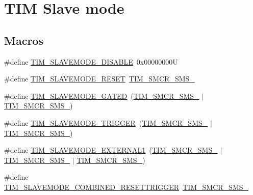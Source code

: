 \hypertarget{group___t_i_m___slave___mode}{}\section{T\+IM Slave mode}
\label{group___t_i_m___slave___mode}
\subsection*{Macros}
\begin{DoxyCompactItemize}
\item 
\#define \mbox{\hyperlink{group___t_i_m___slave___mode_ga3b53e1a85d08f125df4371f86bdaf79b}{T\+I\+M\+\_\+\+S\+L\+A\+V\+E\+M\+O\+D\+E\+\_\+\+D\+I\+S\+A\+B\+LE}}~0x00000000U
\item 
\#define \mbox{\hyperlink{group___t_i_m___slave___mode_ga9f28e350c0560dc550f5c0d2f8b39ba7}{T\+I\+M\+\_\+\+S\+L\+A\+V\+E\+M\+O\+D\+E\+\_\+\+R\+E\+S\+ET}}~\mbox{\hyperlink{group___peripheral___registers___bits___definition_ga63847fc3c71f582403e6301b1229c3ed}{T\+I\+M\+\_\+\+S\+M\+C\+R\+\_\+\+S\+M\+S\+\_}}
\item 
\#define \mbox{\hyperlink{group___t_i_m___slave___mode_ga4501317fcd7649e5ff46db6fe69938e0}{T\+I\+M\+\_\+\+S\+L\+A\+V\+E\+M\+O\+D\+E\+\_\+\+G\+A\+T\+ED}}~(\mbox{\hyperlink{group___peripheral___registers___bits___definition_ga63847fc3c71f582403e6301b1229c3ed}{T\+I\+M\+\_\+\+S\+M\+C\+R\+\_\+\+S\+M\+S\+\_}} $\vert$ \mbox{\hyperlink{group___peripheral___registers___bits___definition_ga7d1ebece401aeb12abd466d2eafa78b2}{T\+I\+M\+\_\+\+S\+M\+C\+R\+\_\+\+S\+M\+S\+\_}})
\item 
\#define \mbox{\hyperlink{group___t_i_m___slave___mode_ga12f8f7b4a16b438f54cf811f0bb0a8a4}{T\+I\+M\+\_\+\+S\+L\+A\+V\+E\+M\+O\+D\+E\+\_\+\+T\+R\+I\+G\+G\+ER}}~(\mbox{\hyperlink{group___peripheral___registers___bits___definition_ga63847fc3c71f582403e6301b1229c3ed}{T\+I\+M\+\_\+\+S\+M\+C\+R\+\_\+\+S\+M\+S\+\_}} $\vert$ \mbox{\hyperlink{group___peripheral___registers___bits___definition_gaa980a3121ab6cda5a4a42b959da8421e}{T\+I\+M\+\_\+\+S\+M\+C\+R\+\_\+\+S\+M\+S\+\_}})
\item 
\#define \mbox{\hyperlink{group___t_i_m___slave___mode_ga90dcf32a66dcb250b18da2ff56471328}{T\+I\+M\+\_\+\+S\+L\+A\+V\+E\+M\+O\+D\+E\+\_\+\+E\+X\+T\+E\+R\+N\+A\+L1}}~(\mbox{\hyperlink{group___peripheral___registers___bits___definition_ga63847fc3c71f582403e6301b1229c3ed}{T\+I\+M\+\_\+\+S\+M\+C\+R\+\_\+\+S\+M\+S\+\_}} $\vert$ \mbox{\hyperlink{group___peripheral___registers___bits___definition_gaa980a3121ab6cda5a4a42b959da8421e}{T\+I\+M\+\_\+\+S\+M\+C\+R\+\_\+\+S\+M\+S\+\_}} $\vert$ \mbox{\hyperlink{group___peripheral___registers___bits___definition_ga7d1ebece401aeb12abd466d2eafa78b2}{T\+I\+M\+\_\+\+S\+M\+C\+R\+\_\+\+S\+M\+S\+\_}})
\item 
\#define \mbox{\hyperlink{group___t_i_m___slave___mode_gad1d2132a7fc439038fd021fa8969e4d7}{T\+I\+M\+\_\+\+S\+L\+A\+V\+E\+M\+O\+D\+E\+\_\+\+C\+O\+M\+B\+I\+N\+E\+D\+\_\+\+R\+E\+S\+E\+T\+T\+R\+I\+G\+G\+ER}}~\mbox{\hyperlink{group___peripheral___registers___bits___definition_gadf87a33432788ed16b0582056d03bc29}{T\+I\+M\+\_\+\+S\+M\+C\+R\+\_\+\+S\+M\+S\+\_}}
\end{DoxyCompactItemize}


